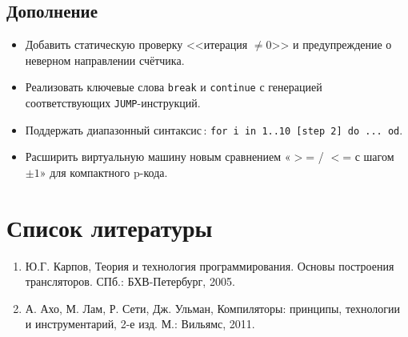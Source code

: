 \documentclass[areasetadvanced]{scrartcl}
\begin{document}
    \subsection*{Дополнение}
    \begin{itemize}
      \item Добавить статическую проверку <<итерация $\neq 0$>> и предупреждение
            о неверном направлении счётчика.
      \item Реализовать ключевые слова \texttt{break} и \texttt{continue}
            с генерацией соответствующих \texttt{JUMP}-инструкций.
      \item Поддержать диапазонный синтаксис\,:  
            \verb|for i in 1..10 [step 2] do ... od|.
      \item Расширить виртуальную машину новым сравнением
            «$>$= / $<$= с шагом $\pm1$» для компактного p-кода.
    \end{itemize}
    
\newpage
\section*{Список литературы}
\begin{enumerate}
    \item Ю.Г. Карпов, Теория и технология программирования. Основы построения
    трансляторов. СПб.: БХВ-Петербург, 2005.
    \item А. Ахо, М. Лам, Р. Сети, Дж. Ульман, Компиляторы: принципы, технологии и
    инструментарий, 2-е изд. М.: Вильямс, 2011.
\end{enumerate}
\end{document}
